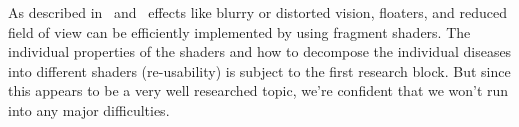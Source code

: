 \documentclass{sig-alternate-05-2015}
\begin{document}
As described in \cite{gazedisplays} and \cite{eyediseasesim} effects like
blurry or distorted vision, floaters, and reduced field of view can be
efficiently implemented by using fragment shaders. The individual properties
of the shaders and how to decompose the individual diseases into different
shaders (re-usability) is subject to the first research block. But since this
appears to be a very well researched topic, we're confident that we won't run
into any major difficulties.

%
%
%
%
%
%
%
%
\end{document}
